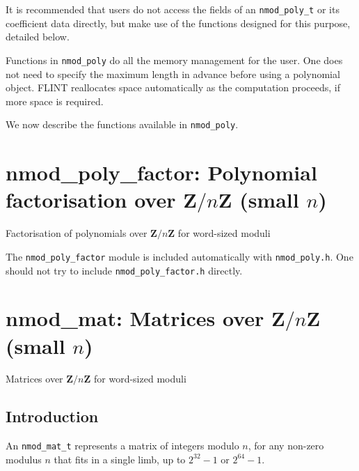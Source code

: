 \documentclass[a4paper,10pt]{book}
\newcommand{\Z}{\mathbf{Z}}%
\newcommand{\code}{\lstinline}
\begin{document}
{{It is recommended that users do not access the fields of an
\code{nmod_poly_t} or its coefficient data directly, but make use of the
functions designed for this purpose, detailed below.

Functions in \code{nmod_poly} do all the memory management for the user.
One does not need to specify the maximum length in advance before using a
polynomial object.  FLINT reallocates space automatically as the computation
proceeds, if more space is required.

We now describe the functions available in \code{nmod_poly}.




\chapter{nmod\_poly\_factor: Polynomial factorisation over $\Z/n\Z$ (small $n$)}
\epigraph{Factorisation of polynomials over $\Z / n \Z$ for word-sized moduli}{}

The \code{nmod_poly_factor} module is included automatically with
\code{nmod_poly.h}. One should not try to include \code{nmod_poly_factor.h}
directly.




\chapter{nmod\_mat: Matrices over $\Z/n\Z$ (small $n$)}
\epigraph{Matrices over $\Z / n \Z$ for word-sized moduli}{}

\section{Introduction}

An \code{nmod_mat_t} represents a matrix of integers modulo $n$, for any
non-zero modulus $n$ that fits in a single limb,
up to $2^{32}-1$ or $2^{64}-1$.

}}
\end{document}
